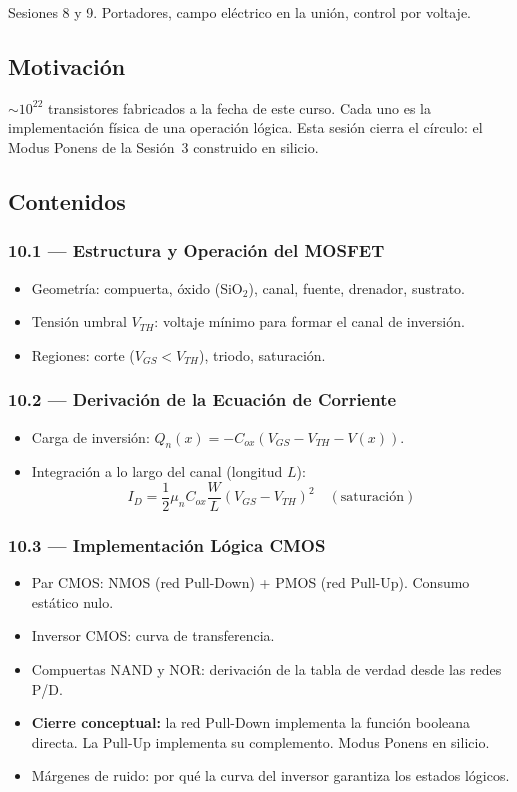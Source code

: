 \documentclass[11pt, letterpaper]{article}
\begin{document}
\begin{prereqs}
Sesiones 8 y 9. Portadores, campo el\'ectrico en la uni\'on, control por voltaje.
\end{prereqs}

\subsection*{Motivaci\'on}
$\sim 10^{22}$ transistores fabricados a la fecha de este curso. Cada uno es la implementaci\'on f\'isica de una operaci\'on l\'ogica. Esta sesi\'on cierra el c\'irculo: el Modus Ponens de la Sesi\'on~3 construido en silicio.

\subsection{Contenidos}

\subsubsection{10.1 --- Estructura y Operaci\'on del MOSFET}
\begin{itemize}
  \item Geometr\'ia: compuerta, \'oxido (SiO$_2$), canal, fuente, drenador, sustrato.
  \item Tensi\'on umbral $V_{TH}$: voltaje m\'inimo para formar el canal de inversi\'on.
  \item Regiones: corte ($V_{GS}<V_{TH}$), triodo, saturaci\'on.
\end{itemize}

\subsubsection{10.2 --- Derivaci\'on de la Ecuaci\'on de Corriente}
\begin{itemize}
  \item Carga de inversi\'on: $Q_n(x)=-C_{ox}(V_{GS}-V_{TH}-V(x))$.
  \item Integraci\'on a lo largo del canal (longitud $L$):
    \[I_D=\frac{1}{2}\mu_nC_{ox}\frac{W}{L}(V_{GS}-V_{TH})^2\quad(\text{saturaci\'on})\]
\end{itemize}

\subsubsection{10.3 --- Implementaci\'on L\'ogica CMOS}
\begin{itemize}
  \item Par CMOS: NMOS (red Pull-Down) + PMOS (red Pull-Up). Consumo est\'atico nulo.
  \item Inversor CMOS: curva de transferencia.
  \item Compuertas NAND y NOR: derivaci\'on de la tabla de verdad desde las redes P/D.
  \item \textbf{Cierre conceptual:} la red Pull-Down implementa la funci\'on booleana directa. La Pull-Up implementa su complemento. Modus Ponens en silicio.
  \item M\'argenes de ruido: por qu\'e la curva del inversor garantiza los estados l\'ogicos.
\end{itemize}
\end{document}
